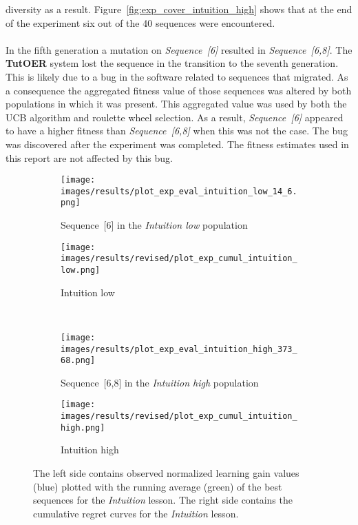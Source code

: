 diversity as a result. Figure~\ref{fig:exp_cover_intuition_high} shows that at
the end of the experiment six out of the 40 sequences were encountered.\\\\
\noindent
In the fifth generation a mutation on \emph{Sequence~[6]} resulted in
\emph{Sequence~[6,8]}. The \textbf{TutOER} system lost the sequence in the
transition to the seventh generation. This is likely due to a bug in the
software related to sequences that migrated. As a consequence the aggregated
fitness value of those sequences was altered by both populations in which it
was present. This aggregated value was used by both the UCB algorithm and
roulette wheel selection. As a result, \emph{Sequence~[6]} appeared to have a
higher fitness than \emph{Sequence~[6,8]} when this was not the case. The bug
was discovered after the experiment was completed. The fitness estimates used
in this report are not affected by this bug.

\begin{figure}[ht]
	\centering
	\begin{subfigure}{0.6\linewidth}
	\centering
	\texttt{[image: images/results/plot\_exp\_eval\_intuition\_low\_14\_6.png]}
	\caption{Sequence~[6] in the \emph{Intuition low} population}
	\label{fig:exp_eval_intuition_low_14}
	\end{subfigure}
	\hfill
	\begin{subfigure}{0.39\linewidth}
	\centering
	\texttt{[image: images/results/revised/plot\_exp\_cumul\_intuition\_low.png]}
	\caption{Intuition low}
	\label{fig:exp_cumul_intuition_low}
	\end{subfigure}\\
	\begin{subfigure}{0.6\linewidth}
	\centering
	\texttt{[image: images/results/plot\_exp\_eval\_intuition\_high\_373\_68.png]}
	\caption{Sequence~[6,8] in the \emph{Intuition high} population}
	\label{fig:exp_eval_intuition_high_373}
	\end{subfigure}
	\hfill
	\begin{subfigure}{0.39\linewidth}
	\centering
	\texttt{[image: images/results/revised/plot\_exp\_cumul\_intuition\_high.png]}
	\caption{Intuition high}
	\label{fig:exp_cumul_intuition_high}
	\end{subfigure}
	\caption[Evaluations of best sequences and cumulative regret in
	Intuition]{The left side contains observed normalized learning gain values
		(blue) plotted with the running average (green) of the best sequences
		for the \emph{Intuition} lesson. The right side contains the cumulative
		regret curves for the \emph{Intuition} lesson.}
	\label{fig:exp_eval_intuition}
\end{figure}

